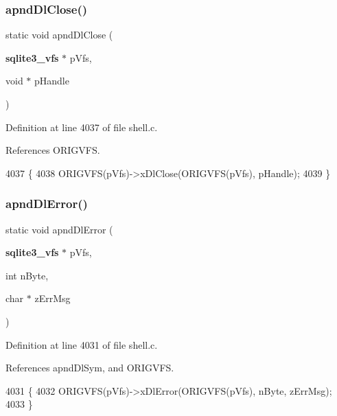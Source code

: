 \subsubsection{apnd\+Dl\+Close()}
{\footnotesize\ttfamily static void apnd\+Dl\+Close (\begin{DoxyParamCaption}\item[{\textbf{ sqlite3\+\_\+vfs} $\ast$}]{p\+Vfs,  }\item[{void $\ast$}]{p\+Handle }\end{DoxyParamCaption})\hspace{0.3cm}{\ttfamily [static]}}



Definition at line 4037 of file shell.\+c.



References O\+R\+I\+G\+V\+FS.


\begin{DoxyCode}
4037                                                          \{
4038   ORIGVFS(pVfs)->xDlClose(ORIGVFS(pVfs), pHandle);
4039 \}
\end{DoxyCode}
\mbox{\label{shell_8c_a37deeb5a92ba0cb8f8107ccc73bea3f0}} 
\subsubsection{apnd\+Dl\+Error()}
{\footnotesize\ttfamily static void apnd\+Dl\+Error (\begin{DoxyParamCaption}\item[{\textbf{ sqlite3\+\_\+vfs} $\ast$}]{p\+Vfs,  }\item[{int}]{n\+Byte,  }\item[{char $\ast$}]{z\+Err\+Msg }\end{DoxyParamCaption})\hspace{0.3cm}{\ttfamily [static]}}



Definition at line 4031 of file shell.\+c.



References apnd\+Dl\+Sym, and O\+R\+I\+G\+V\+FS.


\begin{DoxyCode}
4031                                                                     \{
4032   ORIGVFS(pVfs)->xDlError(ORIGVFS(pVfs), nByte, zErrMsg);
4033 \}
\end{DoxyCode}
\mbox{\label{shell_8c_a8d6e3d44b1cdb4548f5221ebd94013a2}} 
